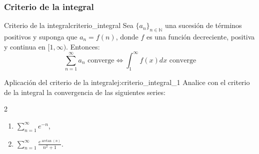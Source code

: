 \subsubsection{Criterio de la integral}

\begin{theorem}{Criterio de la integral}{criterio_integral}
    Sea $\{ a_{n} \}_{n \in \mathbb{N}}$ una sucesión de términos positivos y suponga que $a_{n}=f(n)$, donde $f$ es una función decreciente, positiva y continua en $[1, \infty)$. Entonces:
    \begin{equation}
        \sum_{n=1}^{\infty}a_{n} \text{ converge} \Longleftrightarrow \int_{1}^{\infty}f(x)dx \text{ converge}
    \end{equation}
\end{theorem}

\begin{example}{Aplicación del criterio de la integral}{ej:criterio_integral_1}
    Analice con el criterio de la integral la convergencia de las siguientes series:
    \begin{multicols}{2}
    \begin{enumerate}
        \item $\displaystyle \sum_{n=1}^{\infty}e^{-n}$,
        \item $\displaystyle \sum_{n=1}^{\infty}\frac{e^{\arctan(n)}}{n^{2}+1}$.
    \end{enumerate}
    \end{multicols}
\end{example}

